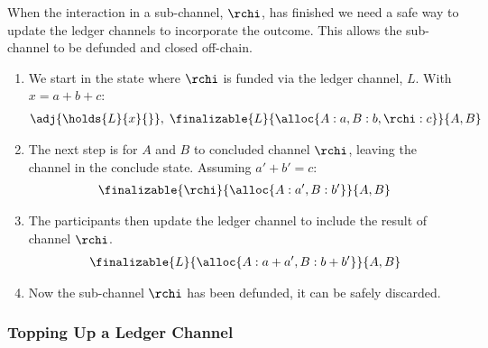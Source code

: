 When the interaction in a sub-channel, $\rchi$, has finished we need a safe way to update the ledger channels to incorporate the outcome.
This allows the sub-channel to be defunded and closed off-chain.
\begin{enumerate}
  \item We start in the state where $\rchi$ is funded via the ledger channel, $L$. With $x = a + b + c$:
  \begin{align}
    \adj{\holds{L}{x}{}}, \; \finalizable{L}{\alloc{A: a, B: b, \rchi: c}}{A, B}
  \end{align}
  \item The next step is for $A$ and $B$ to concluded channel $\rchi$, leaving the channel in the conclude state. Assuming $a' + b' = c$:
  \begin{align}
    \finalizable{\rchi}{\alloc{A:a', B:b'}}{A,B}
  \end{align}
  \item The participants then update the ledger channel to include the result of channel $\rchi$.
  \begin{align}
    \finalizable{L}{\alloc{A: a+ a', B: b + b'}}{A, B}
  \end{align}
  \item Now the sub-channel $\rchi$ has been defunded, it can be safely discarded.
\end{enumerate}

\subsubsection{Topping Up a Ledger Channel}

\begin{figure}[h]\centering
  \makebox[\textwidth][c]{}
  \caption{
  }\label{fig:ledger-top-up}
\end{figure}

